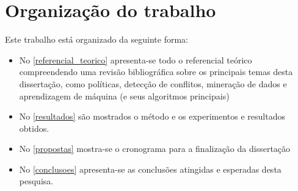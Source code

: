 \documentclass[
	12pt,				%
	openright,			%
	twoside,			%
	a4paper,			%
	english,			%
	french,				%
	spanish,			%
	brazil				%
	]{abntex2}
\begin{document}
\section{Organização do trabalho}
Este trabalho está organizado da seguinte forma:
\begin{itemize}	
	\item No \autoref{referencial_teorico} apresenta-se todo o referencial teórico compreendendo uma revisão bibliográfica sobre os principais temas desta dissertação, como políticas, detecção de conflitos, mineração de dados e aprendizagem de máquina (e seus algoritmos principais)
	\item No \autoref{resultados} são mostrados o método e os experimentos e resultados obtidos.
	\item No \autoref{propostas} mostra-se o cronograma para a finalização da dissertação
	\item No \autoref{conclusoes} apresenta-se as conclusões atingidas e esperadas desta pesquisa.
\end{itemize}
\clearpage

%
%

%
%
%
\end{document}
